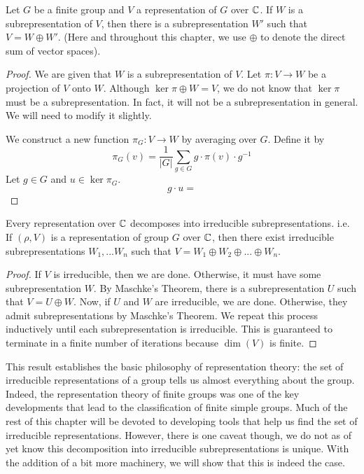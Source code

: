 \begin{theorem}
    Let $G$ be a finite group and $V$ a representation of $G$ over $\mathbb{C}$. If $W$ is a subrepresentation of $V$, then 
there is a subrepresentation $W'$ such that $V = W \oplus W'$. (Here and throughout this chapter, we use $\oplus$ 
to denote the direct sum of vector spaces).
\end{theorem}


\begin{proof}
    We are given that $W$ is a subrepresentation of $V$. Let $\pi : V \rightarrow W$ be a projection of $V$ onto 
    $W$. Although $\ker \pi \oplus W = V$, we do not know that $\ker \pi$ must be a subrepresentation. In fact, it 
    will not be a subrepresentation in general. We will need to modify it slightly.

    We construct a new function $\pi_G : V \rightarrow W$ by averaging over $G$. Define it by
    \[
        \pi_G(v) = \frac{1}{|G|}\sum_{g \in G} g \cdot \pi(v) \cdot g^{-1}
    \]
    Let $g \in G$ and $u \in \ker \pi_G$.
    \[
        g \cdot u =
    \]
    \TODO{!}
\end{proof}



\begin{theorem}
    Every representation over $\mathbb{C}$ decomposes into irreducible subrepresentations. i.e.
    If $(\rho, V)$ is a representation of group $G$ over $\mathbb{C}$, then there exist irreducible subrepresentations 
    $W_1, ...  W_n$ such that $V = W_1 \oplus W_2 \oplus ... \oplus W_n$.
\end{theorem}

\begin{proof}
    If $V$ is irreducible, then we are done. Otherwise, it must have some subrepresentation $W$. By Maschke's 
    Theorem, there is a subrepresentation $U$ such that $V = U \oplus W$. Now, if $U$ and $W$ are irreducible, we 
    are done. Otherwise, they admit subrepresentations by Maschke's Theorem. We repeat this process inductively 
    until each subrepresentation is irreducible. This is guaranteed to terminate in a finite number of iterations 
    because $\dim(V)$ is finite.
\end{proof}
This result establishes the basic philosophy of representation theory: the set of irreducible representations of a 
group tells us almost everything about the group.  Indeed, the representation theory of finite groups was one of 
the key developments that lead to the classification of finite simple groups.  Much of the rest of this chapter 
will be devoted to developing tools that help us find the set of irreducible representations. However, there is one 
caveat though, we do not as of yet know this decomposition into irreducible subrepresentations is unique. With the 
addition of a bit more machinery, we will show that this is indeed the case.
 
